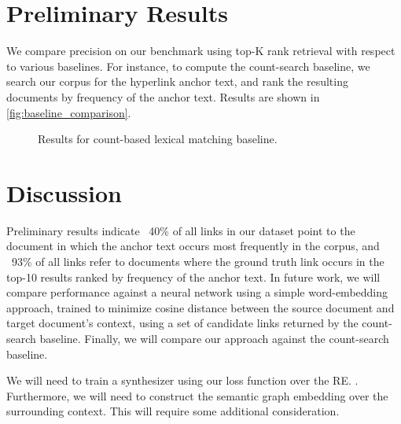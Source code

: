 \documentclass{article}
\begin{document}
\begin{figure}
\end{figure}


\section{Preliminary Results}

We compare precision on our benchmark using top-K rank retrieval with respect to various baselines. For instance, to compute the count-search baseline, we search our corpus for the hyperlink anchor text, and rank the resulting documents by frequency of the anchor text. Results are shown in \autoref{fig:baseline_comparison}.

\begin{figure}[H]
\centering
{}
\caption{Results for count-based lexical matching baseline.}
\label{fig:baseline_comparison}
\end{figure}

\section{Discussion}

Preliminary results indicate ~40\% of all links in our dataset point to the document in which the anchor text occurs most frequently in the corpus, and ~93\% of all links refer to documents where the ground truth link occurs in the top-10 results ranked by frequency of the anchor text. In future work, we will compare performance against a neural network using a simple word-embedding approach, trained to minimize cosine distance between the source document and target document's context, using a set of candidate links returned by the count-search baseline. Finally, we will compare our approach against the count-search baseline.

We will need to train a synthesizer using our loss function over the RE. . Furthermore, we will need to construct the semantic graph embedding over the surrounding context. This will require some additional consideration.

\clearpage
\newpage



\end{document}
